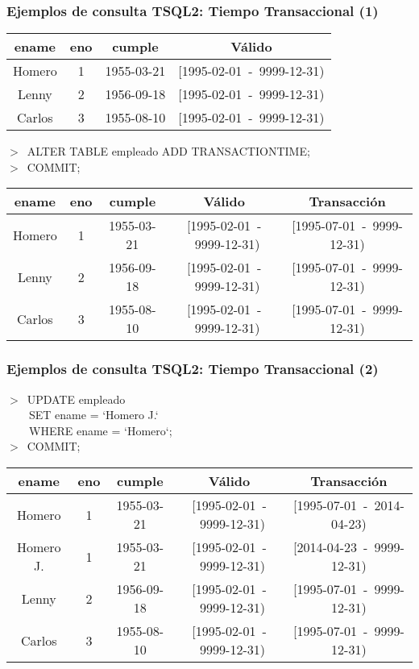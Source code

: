 \documentclass[12pt]{beamer}
\begin{document}
\begin{frame}
\frametitle{Ejemplos de consulta TSQL2: Tiempo Transaccional (1)}
\begin{center}
\begin{tabular}{|c|c|c||c|}
\hline
ename & eno & cumple & V\'alido\\
\hline
Homero & 1 & 1955-03-21 & [1995-02-01\ -\ 9999-12-31)\\
\hline
Lenny & 2 & 1956-09-18 & [1995-02-01\ -\ 9999-12-31)\\
\hline
Carlos & 3 & 1955-08-10 & [1995-02-01\ -\ 9999-12-31)\\
\hline
\end{tabular}
\end{center}
$>$\ ALTER TABLE empleado ADD TRANSACTIONTIME;\\
$>$\ COMMIT;
\begin{center}
\begin{tiny}
\begin{tabular}{|c|c|c||c|c|}
\hline
ename & eno & cumple & V\'alido & Transacci\'on\\
\hline
Homero & 1 & 1955-03-21 & [1995-02-01\ -\ 9999-12-31) & [1995-07-01\ -\ 9999-12-31)\\
\hline
Lenny & 2 & 1956-09-18 & [1995-02-01\ -\ 9999-12-31) & [1995-07-01\ -\ 9999-12-31)\\
\hline
Carlos & 3 & 1955-08-10 & [1995-02-01\ -\ 9999-12-31) & [1995-07-01\ -\ 9999-12-31)\\
\hline
\end{tabular}
\end{tiny}
\end{center}
\end{frame}

\begin{frame}
\frametitle{Ejemplos de consulta TSQL2: Tiempo Transaccional (2)}
$>$\ UPDATE empleado\\
\ \ \ \ SET ename = `Homero J.`\\
\ \ \ \ WHERE ename = `Homero`;\\
$>$\ COMMIT;
\begin{center}
\begin{tiny}
\begin{tabular}{|c|c|c||c|c|}
\hline
ename & eno & cumple & V\'alido & Transacci\'on\\
\hline
Homero & 1 & 1955-03-21 & [1995-02-01\ -\ 9999-12-31) & [1995-07-01\ -\ 2014-04-23)\\
\hline
Homero J. & 1 & 1955-03-21 & [1995-02-01\ -\ 9999-12-31) & [2014-04-23\ -\ 9999-12-31)\\
\hline
Lenny & 2 & 1956-09-18 & [1995-02-01\ -\ 9999-12-31) & [1995-07-01\ -\ 9999-12-31)\\
\hline
Carlos & 3 & 1955-08-10 & [1995-02-01\ -\ 9999-12-31) & [1995-07-01\ -\ 9999-12-31)\\
\hline
\end{tabular}
\end{tiny}
\end{center}

\end{frame}
\end{document}
